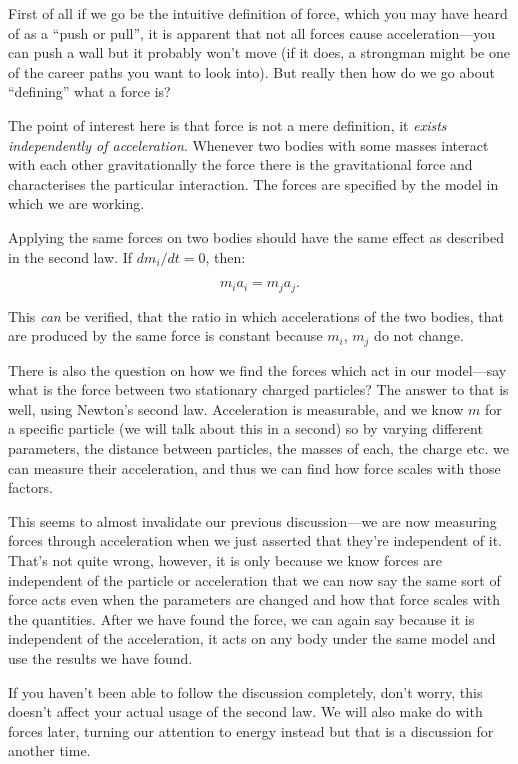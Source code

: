 First of all if we go be the intuitive definition of force, which you 
may have heard of as a “push or pull”, it is apparent that not all 
forces cause acceleration—you can push a wall but it probably won't 
move (if it does, a strongman might be one of the career paths you want 
to look into). But really then how do we go about “defining” what a 
force is?

The point of interest here is that force is not a mere definition, it 
\textit{exists independently of acceleration}. Whenever two bodies with 
some masses interact with each other gravitationally the force there is 
the gravitational force and characterises the particular interaction. 
The forces are specified by the model in which we are working.

Applying the same forces on two bodies should have the same effect as 
described in the second law. If $dm_i/dt = 0$, then:

\[
m_i a_i = m_j a_j.
\]

This \textit{can} be verified, that the ratio in which accelerations of 
the two bodies, that are produced by the same force is constant because 
$m_i$, $m_j$ do not change.

There is also the question on how we find the forces which act in our 
model—say what is the force between two stationary charged particles? 
The answer to that is well, using Newton's second law. Acceleration is 
measurable, and we know $m$ for a specific particle (we will talk about 
this in a second) so by varying different parameters, the distance 
between particles, the masses of each, the charge etc. we can measure 
their acceleration, and thus we can find how force scales with those 
factors.

This seems to almost invalidate our previous discussion—we are now 
measuring forces through acceleration when we just asserted that they're 
independent of it. That's not quite wrong, however, it is only because 
we know forces are independent of the particle or acceleration that we 
can now say the same sort of force acts even when the parameters are 
changed and how that force scales with the quantities. After we have 
found the force, we can again say because it is independent of the 
acceleration, it acts on any body under the same model and use the 
results we have found.

If you haven't been able to follow the discussion completely, don't 
worry, this doesn't affect your actual usage of the second law. We will 
also make do with forces later, turning our attention to energy instead 
but that is a discussion for another time.

